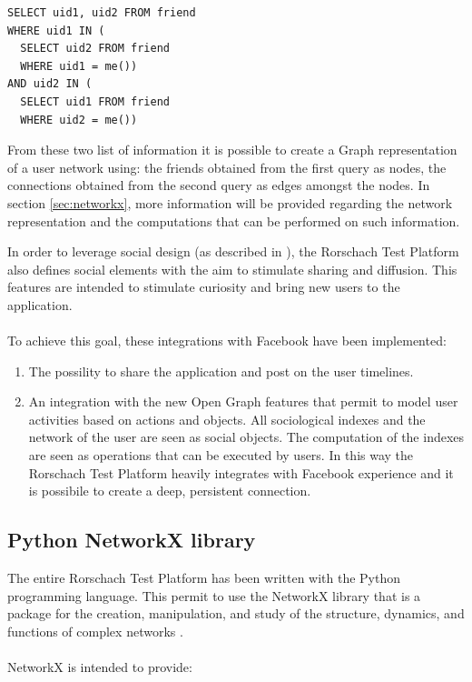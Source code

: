 \begin{enumerate}
\begin{itemize}
\begin{lstlisting}
SELECT uid1, uid2 FROM friend
WHERE uid1 IN (
  SELECT uid2 FROM friend
  WHERE uid1 = me())
AND uid2 IN (
  SELECT uid1 FROM friend
  WHERE uid2 = me())
\end{lstlisting}

\end{itemize}

From these two list of information it is possible to create a Graph representation of a user network using: the friends obtained from the first query as nodes,
the connections obtained from the second query as edges amongst the nodes.
In section \ref{sec:networkx}, more information will be provided regarding the network representation and the computations that can be performed on such information.
\end{enumerate}

In order to leverage social design (as described in \cite{Wasserman-1994}), the Rorschach Test Platform also defines social elements with the aim to stimulate
sharing and diffusion.
This features are intended to stimulate curiosity and bring new users to the application.\\
\\
To achieve this goal, these integrations with Facebook have been implemented:
\begin{enumerate}
\item The possility to share the application and post on the user timelines.
\item An integration with the new Open Graph features that permit to model user activities based on actions and objects.
All sociological indexes and the network of the user are seen as social objects.
The computation of the indexes are seen as operations that can be executed by users.
In this way the Rorschach Test Platform heavily integrates with Facebook experience and it is possibile to create a deep, persistent connection.
\end{enumerate}

\label{sec:networkx}
\subsection{Python NetworkX library}
The entire Rorschach Test Platform has been written with the Python programming language.
This permit to use the NetworkX library that is a package for the creation, manipulation, and study of the structure, dynamics, and functions of complex
networks \cite{Hagberg-2008}.\\
\\
NetworkX is intended to provide:

